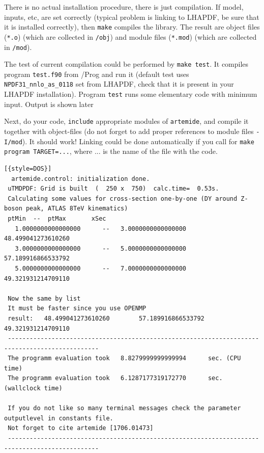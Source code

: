 \documentclass[prd,nofootinbib,eqsecnum,final]{revtex4}
\renewcommand{\(}{\left(}
\renewcommand{\)}{\right)}
\renewcommand{\[}{\left[}
\renewcommand{\]}{\right]}
\begin{document}
There is no actual installation procedure, there is just compilation. If model, inputs, etc, are set correctly (typical problem is linking to LHAPDF, be sure that it is installed correctly), then \texttt{make} compiles the library. The result are object files (\texttt{*.o}) (which are collected in \texttt{/obj}) and module files (\texttt{*.mod}) (which are collected in \texttt{/mod}). 

The test of current compilation could be performed by \texttt{make test}. It compiles program \texttt{test.f90} from /Prog and run it (default test uses \texttt{NPDF31\_nnlo\_as\_0118} set from LHAPDF, check that it is present in your LHAPDF installation). Program \texttt{test} runs some elementary code with minimum input. Output is shown later

Next, do your code, \texttt{include} appropriate modules of \texttt{artemide}, and compile it together with object-files (do not forget to add proper references to module files \texttt{-I/mod}). It should work! Linking could be done automatically if you call for \texttt{make program TARGET=...}, where ... is the name of the file with the code.

\begin{lstlisting}[{style=DOS}]
  artemide.control: initialization done.
 uTMDPDF: Grid is built  (  250 x  750)  calc.time=  0.53s. 
 Calculating some values for cross-section one-by-one (DY around Z-boson peak, ATLAS 8TeV kinematics)
 ptMin 	--	ptMax		xSec
   1.0000000000000000      --   3.0000000000000000        48.499041273610260     
   3.0000000000000000      --   5.0000000000000000        57.189916866533792     
   5.0000000000000000      --   7.0000000000000000        49.321931214709110     
  
 Now the same by list
 It must be faster since you use OPENMP
 result:   48.499041273610260        57.189916866533792        49.321931214709110     
 -----------------------------------------------------------------------------------------------
 The programm evaluation took   8.8279999999999994      sec. (CPU time)
 The programm evaluation took   6.1287177319172770      sec. (wallclock time)
   
 If you do not like so many terminal messages check the parameter outputlevel in constants file.
 Not forget to cite artemide [1706.01473]
 -----------------------------------------------------------------------------------------------


\end{lstlisting}
\end{document}
